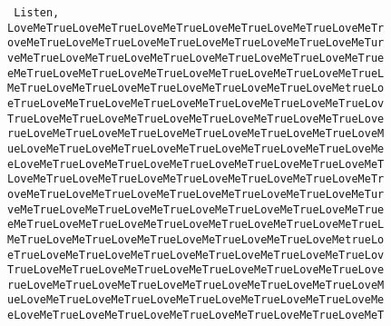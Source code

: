 \documentclass[../IHMain]{subfiles}
\begin{document}
        \newpage
    \yoko
    \thispagestyle{empty}
    \tt
    Listen,\\
    LoveMeTrueLoveMeTrueLoveMeTrueLoveMeTrueLoveMeTrueLoveMeTr\\
    oveMeTrueLoveMeTrueLoveMeTrueLoveMeTrueLoveMeTrueLoveMeTur\\
    veMeTrueLoveMeTrueLoveMeTrueLoveMeTrueLoveMeTrueLoveMeTrue\\
    eMeTrueLoveMeTrueLoveMeTrueLoveMeTrueLoveMeTrueLoveMeTrueL\\
    MeTrueLoveMeTrueLoveMeTrueLoveMeTrueLoveMeTrueLoveMetrueLo\\
    eTrueLoveMeTrueLoveMeTrueLoveMeTrueLoveMeTrueLoveMeTrueLov\\
    TrueLoveMeTrueLoveMeTrueLoveMeTrueLoveMeTrueLoveMeTrueLove\\
    rueLoveMeTrueLoveMeTrueLoveMeTrueLoveMeTrueLoveMeTrueLoveM\\
    ueLoveMeTrueLoveMeTrueLoveMeTrueLoveMeTrueLoveMeTrueLoveMe\\
    eLoveMeTrueLoveMeTrueLoveMeTrueLoveMeTrueLoveMeTrueLoveMeT\\
    LoveMeTrueLoveMeTrueLoveMeTrueLoveMeTrueLoveMeTrueLoveMeTr\\
    oveMeTrueLoveMeTrueLoveMeTrueLoveMeTrueLoveMeTrueLoveMeTur\\
    veMeTrueLoveMeTrueLoveMeTrueLoveMeTrueLoveMeTrueLoveMeTrue\\
    eMeTrueLoveMeTrueLoveMeTrueLoveMeTrueLoveMeTrueLoveMeTrueL\\
    MeTrueLoveMeTrueLoveMeTrueLoveMeTrueLoveMeTrueLoveMetrueLo\\
    eTrueLoveMeTrueLoveMeTrueLoveMeTrueLoveMeTrueLoveMeTrueLov\\
    TrueLoveMeTrueLoveMeTrueLoveMeTrueLoveMeTrueLoveMeTrueLove\\
    rueLoveMeTrueLoveMeTrueLoveMeTrueLoveMeTrueLoveMeTrueLoveM\\
    ueLoveMeTrueLoveMeTrueLoveMeTrueLoveMeTrueLoveMeTrueLoveMe\\
    eLoveMeTrueLoveMeTrueLoveMeTrueLoveMeTrueLoveMeTrueLoveMeT\\
\end{document}

